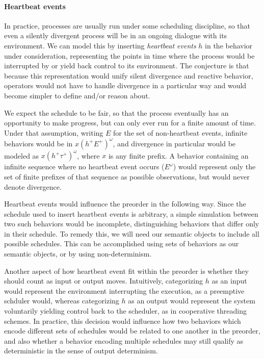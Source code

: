 \documentclass[11pt]{article}
\begin{document}
\paragraph{Heartbeat events}

In practice,
processes are usually run under some scheduling discipline,
so that even a silently divergent process will be
in an ongoing dialogue with its environment.
We can model this by inserting \emph{heartbeat events} $h$
in the behavior under consideration,
representing the points in time where
the process would be interrupted by
or yield back control to its environment.
The conjecture is that because this representation would
unify silent divergence and reactive behavior,
operators would not have to handle divergence
in a particular way and
would become simpler to define and/or reason about.

We expect the schedule to be fair,
so that the process eventually has an opportunity
to make progress,
but can only ever run for a finite amount of time.
Under that assumption,
writing $E$ for the set of non-heartbeat events,
infinite behaviors would be in $x (h^+ E^+)^\omega$,
and divergence in particular would be modeled as $x (h^+ \tau^+)^\omega$,
where $x$ is any finite prefix.
A behavior containing
an infinite sequence where no heartbeat event occurs ($E^\omega$)
would represent only the set of finite prefixes
of that sequence as possible observations,
but would never denote divergence.

Heartbeat events would influence the preorder in the following way.
Since the schedule used to insert heartbeat events is arbitrary,
a simple simulation between two such behaviors would be incomplete,
distinguishing behaviors that differ only in their schedule.
To remedy this,
we will need our semantic objects to
include all possible schedules.
This can be accomplished using sets of behaviors
as our semantic objects,
or by using non-determinism.

Another aspect of how heartbeat event fit within the preorder
is whether they should count as input or output moves.
Intuitively, categorizing $h$ as an input
would represent the environment interrupting the execution,
as a preemptive schduler would,
whereas categorizing $h$ as an output
would represent the system voluntarily yielding control
back to the scheduler,
as in cooperative threading schemes.
In practice,
this decision would influence how two behaviors
which encode different sets of schedules
would be related to one another in the preorder,
and also whether a behavior encoding multiple schedules
may still qualify as deterministic
in the sense of output determinism.
\end{document}
